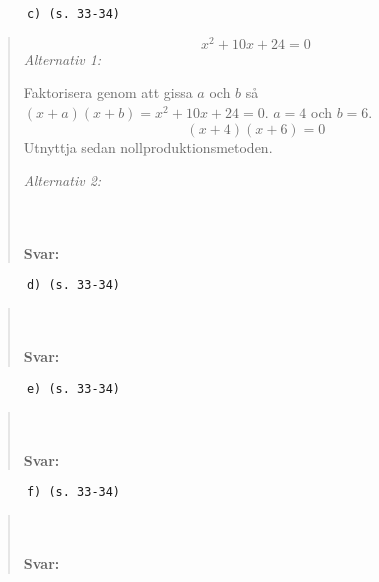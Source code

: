 \documentclass[a4paper]{article}
\newcommand{\tskcol}[1]{\textcolor{tskcol}{#1}}
\begin{document}
	\texttt{\tskcol{~~~~~~c) (s. 33-34)}}
	\begin{quotation}
		\noindent
		\[x^2+10x+24=0\] 
		\emph{Alternativ 1:}
		
		Faktorisera genom att gissa $a$ och $b$ så $(x+a)(x+b)=x^2+10x+24=0$. $a = 4$ och $b = 6$. 
		\[(x+4)(x+6)=0\]
		Utnyttja sedan nollproduktionsmetoden.
		
		\emph{Alternativ 2:}
		
		
		\\ \\
		\textbf{Svar:}
	\end{quotation}
	
	
	\texttt{\tskcol{~~~~~~d) (s. 33-34)}}
	\begin{quotation}
		\noindent
		\\ \\
		\textbf{Svar:}
	\end{quotation}
	
	
	\texttt{\tskcol{~~~~~~e) (s. 33-34)}}
	\begin{quotation}
		\noindent
		\\ \\
		\textbf{Svar:}
	\end{quotation}
	
	
	\texttt{\tskcol{~~~~~~f) (s. 33-34)}}
	\begin{quotation}
		\noindent
		\\ \\
		\textbf{Svar:}
	\end{quotation}
	
\end{document}
